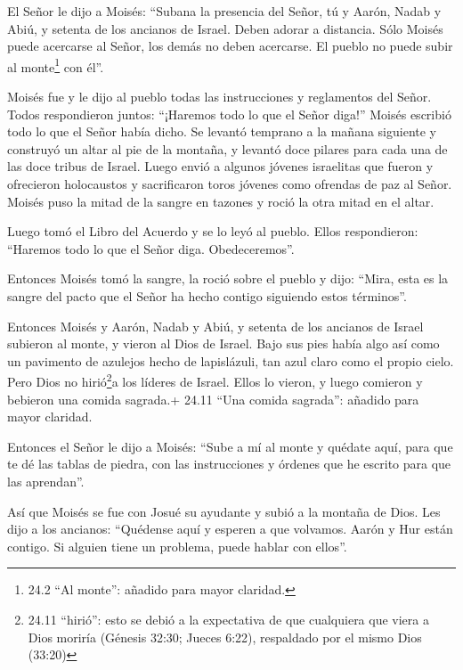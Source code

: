 El Señor le dijo a Moisés: ``Subana la presencia del Señor,
tú y Aarón, Nadab y Abiú, y setenta de los ancianos de Israel. Deben
adorar a distancia.  Sólo Moisés puede acercarse al Señor,
los demás no deben acercarse. El pueblo no puede subir al
monte\footnote{24.2 ``Al monte'': añadido para mayor claridad.} con
él''.

 Moisés fue y le dijo al pueblo todas las instrucciones y
reglamentos del Señor. Todos respondieron juntos: ``¡Haremos todo lo que
el Señor diga!''  Moisés escribió todo lo que el Señor había
dicho. Se levantó temprano a la mañana siguiente y construyó un altar al
pie de la montaña, y levantó doce pilares para cada una de las doce
tribus de Israel.  Luego envió a algunos jóvenes israelitas
que fueron y ofrecieron holocaustos y sacrificaron toros jóvenes como
ofrendas de paz al Señor.  Moisés puso la mitad de la sangre
en tazones y roció la otra mitad en el altar.

 Luego tomó el Libro del Acuerdo y se lo leyó al pueblo.
Ellos respondieron: ``Haremos todo lo que el Señor diga. Obedeceremos''.

 Entonces Moisés tomó la sangre, la roció sobre el pueblo y
dijo: ``Mira, esta es la sangre del pacto que el Señor ha hecho contigo
siguiendo estos términos''.

 Entonces Moisés y Aarón, Nadab y Abiú, y setenta de los
ancianos de Israel subieron al monte,  y vieron al Dios de
Israel. Bajo sus pies había algo así como un pavimento de azulejos hecho
de lapislázuli, tan azul claro como el propio cielo.  Pero
Dios no hirió\footnote{24.11 ``hirió'': esto se debió a la expectativa
  de que cualquiera que viera a Dios moriría (Génesis 32:30; Jueces
  6:22), respaldado por el mismo Dios (33:20)}a los líderes de Israel.
Ellos lo vieron, y luego comieron y bebieron una comida sagrada.+ 24.11
``Una comida sagrada'': añadido para mayor claridad.

 Entonces el Señor le dijo a Moisés: ``Sube a mí al monte y
quédate aquí, para que te dé las tablas de piedra, con las instrucciones
y órdenes que he escrito para que las aprendan''.

 Así que Moisés se fue con Josué su ayudante y subió a la
montaña de Dios.  Les dijo a los ancianos: ``Quédense aquí
y esperen a que volvamos. Aarón y Hur están contigo. Si alguien tiene un
problema, puede hablar con ellos''.

